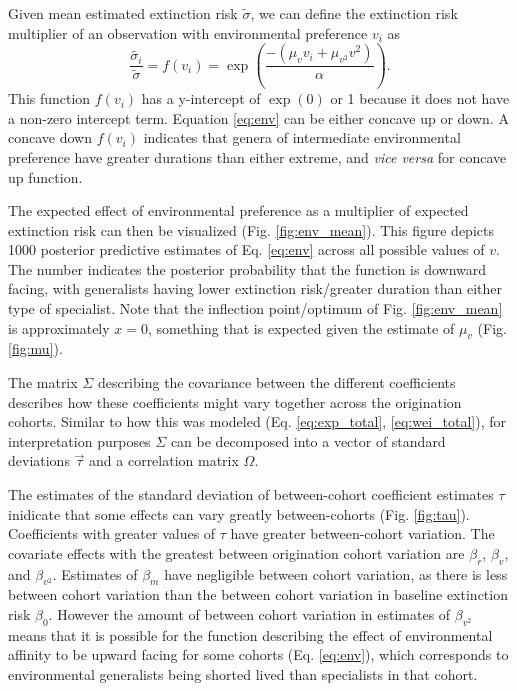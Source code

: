 \documentclass[12pt,letterpaper]{article}
\begin{document}
Given mean estimated extinction risk \(\tilde{\sigma}\), we can define the extinction risk multiplier of an observation with environmental preference \(v_{i}\) as 
\begin{equation}
  \frac{\tilde{\sigma_{i}}}{\tilde{\sigma}} = f(v_{i}) = \exp\left(\frac{-(\mu_{v} v_{i} + \mu_{v^{2}} v^{2})}{\alpha}\right).
  \label{eq:env}
\end{equation}
This function \(f(v_{i})\) has a y-intercept of \(\exp(0)\) or 1 because it does not have a non-zero intercept term. Equation \ref{eq:env} can be either concave up or down. A concave down \(f(v_{i})\) indicates that genera of intermediate environmental preference have greater durations than either extreme, and \textit{vice versa} for concave up function.

The expected effect of environmental preference as a multiplier of expected extinction risk can then be visualized (Fig. \ref{fig:env_mean}). This figure depicts 1000 posterior predictive estimates of Eq. \ref{eq:env} across all possible values of \(v\). The number indicates the posterior probability that the function is downward facing, with generalists having lower extinction risk/greater duration than either type of specialist. Note that the inflection point/optimum of Fig. \ref{fig:env_mean} is approximately \(x = 0\), something that is expected given the estimate of \(\mu_{v}\) (Fig. \ref{fig:mu}).

The matrix \(\Sigma\) describing the covariance between the different coefficients describes how these coefficients might vary together across the origination cohorts. Similar to how this was modeled (Eq. \ref{eq:exp_total}, \ref{eq:wei_total}), for interpretation purposes \(\Sigma\) can be decomposed into a vector of standard deviations \(\vec{\tau}\) and a correlation matrix \(\Omega\).

The estimates of the standard deviation of between-cohort coefficient estimates \(\tau\) inidicate that some effects can vary greatly between-cohorts (Fig. \ref{fig:tau}). Coefficients with greater values of \(\tau\) have greater between-cohort variation. The covariate effects with the greatest between origination cohort variation are \(\beta_{r}\), \(\beta_{v}\), and \(\beta_{v^{2}}\). Estimates of \(\beta_{m}\) have negligible between cohort variation, as there is less between cohort variation than the between cohort variation in baseline extinction risk \(\beta_{0}\). However the amount of between cohort variation in estimates of \(\beta_{v^{2}}\) means that it is possible for the function describing the effect of environmental affinity to be upward facing for some cohorts (Eq. \ref{eq:env}), which corresponds to environmental generalists being shorted lived than specialists in that cohort.
\end{document}
